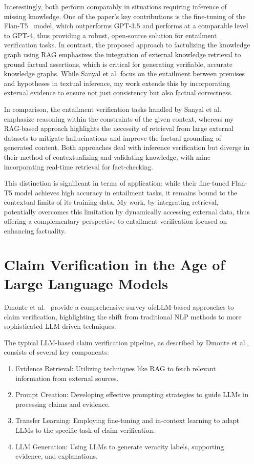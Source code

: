 Interestingly, both perform comparably in situations requiring inference of missing knowledge.
One of the paper's key contributions is the fine-tuning of the Flan-T5~\cite{https://doi.org/10.48550/arxiv.2210.11416} model, which outperforms GPT-3.5 and performs at a comparable level to GPT-4, thus providing a robust, open-source solution for entailment verification tasks.
In contrast, the proposed approach to factulizing the knowledge graph using \ac{RAG} emphasizes the integration of external knowledge retrieval to ground factual assertions, which is critical for generating verifiable, accurate knowledge graphs.
While Sanyal et al. focus on the entailment between premises and hypotheses in textual inference, my work extends this by incorporating external evidence to ensure not just consistency but also factual correctness.

In comparison, the entailment verification tasks handled by Sanyal et al. emphasize reasoning within the constraints of the given context, whereas my \ac{RAG}-based approach highlights the necessity of retrieval from large external datasets to mitigate hallucinations and improve the factual grounding of generated content.
Both approaches deal with inference verification but diverge in their method of contextualizing and validating knowledge, with mine incorporating real-time retrieval for fact-checking.

This distinction is significant in terms of application: while their fine-tuned Flan-T5 model achieves high accuracy in entailment tasks, it remains bound to the contextual limits of its training data.
My work, by integrating retrieval, potentially overcomes this limitation by dynamically accessing external data, thus offering a complementary perspective to entailment verification focused on enhancing factuality.

\section{Claim Verification in the Age of Large Language Models}\label{subsec:claim-verification-in-the-age-of-large-language-models}
Dmonte et al.~\cite{dmonte2024claimverificationagelarge} provide a comprehensive survey ofc\ac{LLM}-based approaches to claim verification, highlighting the shift from traditional \ac{NLP} methods to more sophisticated LLM-driven techniques.

The typical LLM-based claim verification pipeline, as described by Dmonte et al., consists of several key components:
\begin{enumerate}
    \item Evidence Retrieval: Utilizing techniques like \ac{RAG} to fetch relevant information from external sources.
    \item Prompt Creation: Developing effective prompting strategies to guide LLMs in processing claims and evidence.
    \item Transfer Learning: Employing fine-tuning and in-context learning to adapt LLMs to the specific task of claim verification.
    \item LLM Generation: Using LLMs to generate veracity labels, supporting evidence, and explanations.
\end{enumerate}

